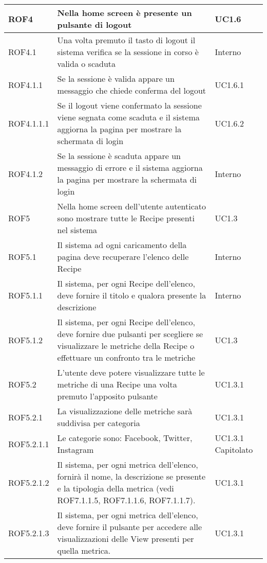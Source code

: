 \begin{center}
\begin{longtable}{| p{2.5cm} | p{8cm} | p{2cm} |}

		\hline
		ROF4  &  Nella home screen è presente un pulsante di logout  &  UC1.6 \\
		\hline
		ROF4.1  &  Una volta premuto il tasto di logout il sistema verifica se la sessione in corso è valida o scaduta  &  Interno \\
		\hline
		ROF4.1.1  &  Se la sessione è valida appare un messaggio che chiede conferma del logout  &  UC1.6.1 \\
		\hline
		ROF4.1.1.1  &  Se il logout viene confermato la sessione viene segnata come scaduta e il sistema aggiorna la pagina per mostrare la schermata di login  &  UC1.6.2 \\
		\hline
		ROF4.1.2  &  Se la sessione è scaduta appare un messaggio di errore e il sistema aggiorna la pagina per mostrare la schermata di login  &  Interno \\


		\hline
		ROF5  &  Nella home screen dell'utente autenticato sono mostrare tutte le Recipe presenti nel sistema &  UC1.3 \\
		\hline
		ROF5.1  & Il sistema ad ogni caricamento della pagina deve recuperare l'elenco delle Recipe  &  Interno \\
		\hline
		ROF5.1.1  & Il sistema, per ogni Recipe dell'elenco, deve fornire il titolo e qualora presente la descrizione  &  Interno \\
		\hline
		ROF5.1.2  & Il sistema, per ogni Recipe dell'elenco, deve fornire due pulsanti per scegliere se visualizzare le metriche della Recipe o effettuare un confronto tra le metriche &  UC1.3 \\
		\hline
		ROF5.2  &  L'utente deve potere visualizzare tutte le metriche di una Recipe una volta premuto l'apposito pulsante  &  UC1.3.1 \\
		\hline
		ROF5.2.1  &  La visualizzazione delle metriche sarà suddivisa per categoria  &  UC1.3.1 \\
		\hline
		ROF5.2.1.1  &  Le categorie sono: Facebook, Twitter, Instagram &  UC1.3.1 \newline Capitolato \\
		\hline
		ROF5.2.1.2  &  Il sistema, per ogni metrica dell'elenco, fornirà il nome, la descrizione se presente e la tipologia della metrica (vedi ROF7.1.1.5, ROF7.1.1.6, ROF7.1.1.7). &  UC1.3.1 \\
		\hline
		ROF5.2.1.3  &  Il sistema, per ogni metrica dell'elenco, deve fornire il pulsante per accedere alle visualizzazioni delle View presenti per quella metrica. &  UC1.3.1 \\
		\hline


\end{longtable}
\end{center}
